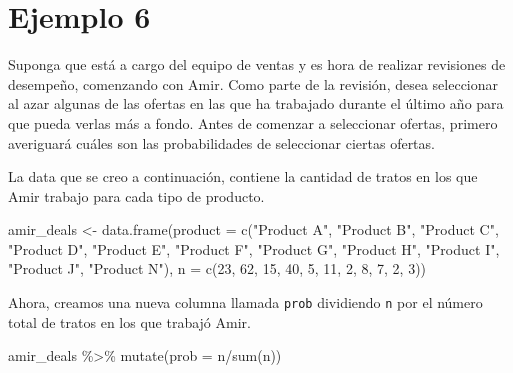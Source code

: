 \documentclass[
  letterpaper,
  DIV=11,
  numbers=noendperiod]{scrreprt}
\newenvironment{Shaded}{\begin{snugshade}}{\end{snugshade}}
\newcommand{\AttributeTok}[1]{\textcolor[rgb]{0.40,0.45,0.13}{#1}}
\newcommand{\DecValTok}[1]{\textcolor[rgb]{0.68,0.00,0.00}{#1}}
\newcommand{\FunctionTok}[1]{\textcolor[rgb]{0.28,0.35,0.67}{#1}}
\newcommand{\NormalTok}[1]{\textcolor[rgb]{0.00,0.23,0.31}{#1}}
\newcommand{\OtherTok}[1]{\textcolor[rgb]{0.00,0.23,0.31}{#1}}
\newcommand{\SpecialCharTok}[1]{\textcolor[rgb]{0.37,0.37,0.37}{#1}}
\newcommand{\StringTok}[1]{\textcolor[rgb]{0.13,0.47,0.30}{#1}}
\begin{document}
\hypertarget{ejemplo-6}{%
\section{Ejemplo 6}\label{ejemplo-6}}

Suponga que está a cargo del equipo de ventas y es hora de realizar
revisiones de desempeño, comenzando con Amir. Como parte de la revisión,
desea seleccionar al azar algunas de las ofertas en las que ha trabajado
durante el último año para que pueda verlas más a fondo. Antes de
comenzar a seleccionar ofertas, primero averiguará cuáles son las
probabilidades de seleccionar ciertas ofertas.

La data que se creo a continuación, contiene la cantidad de tratos en
los que Amir trabajo para cada tipo de producto.

\begin{Shaded}
\begin{Highlighting}[]
\NormalTok{amir\_deals }\OtherTok{\textless{}{-}} \FunctionTok{data.frame}\NormalTok{(}\AttributeTok{product =} \FunctionTok{c}\NormalTok{(}\StringTok{"Product A"}\NormalTok{, }\StringTok{"Product B"}\NormalTok{, }\StringTok{"Product C"}\NormalTok{, }\StringTok{"Product D"}\NormalTok{, }\StringTok{"Product E"}\NormalTok{, }\StringTok{"Product F"}\NormalTok{, }\StringTok{"Product G"}\NormalTok{, }\StringTok{"Product H"}\NormalTok{, }\StringTok{"Product I"}\NormalTok{, }\StringTok{"Product J"}\NormalTok{, }\StringTok{"Product N"}\NormalTok{), }\AttributeTok{n =} \FunctionTok{c}\NormalTok{(}\DecValTok{23}\NormalTok{, }\DecValTok{62}\NormalTok{, }\DecValTok{15}\NormalTok{, }\DecValTok{40}\NormalTok{, }\DecValTok{5}\NormalTok{, }\DecValTok{11}\NormalTok{, }\DecValTok{2}\NormalTok{, }\DecValTok{8}\NormalTok{, }\DecValTok{7}\NormalTok{, }\DecValTok{2}\NormalTok{, }\DecValTok{3}\NormalTok{))}
\end{Highlighting}
\end{Shaded}

Ahora, creamos una nueva columna llamada \texttt{prob} dividiendo
\texttt{n} por el número total de tratos en los que trabajó Amir.

\begin{Shaded}
\begin{Highlighting}[]
\NormalTok{amir\_deals }\SpecialCharTok{\%\textgreater{}\%}
  \FunctionTok{mutate}\NormalTok{(}\AttributeTok{prob =}\NormalTok{ n}\SpecialCharTok{/}\FunctionTok{sum}\NormalTok{(n))}
\end{Highlighting}
\end{Shaded}
\end{document}
